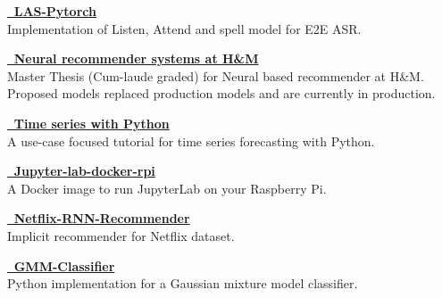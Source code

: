 



\textcolor{SlateGrey}{\textbf{\href{https://github.com/jiwidi/las-pytorch}{\faGithub \, LAS-Pytorch }}} \\ 
Implementation of Listen, Attend and spell model for E2E ASR.
\newline
\vspace{1pt}

\textcolor{SlateGrey}{\textbf{\href{https://github.com/jiwidi/MASTER_THESIS/blob/master/thesis.pdf}{\faGithub \,  Neural recommender systems at H\&M  }}} \\ 
Master Thesis (Cum-laude graded) for Neural based recommender at H\&M. Proposed models replaced production models and are currently in production.
\newline
\vspace{1pt}

\textcolor{SlateGrey}{\textbf{\href{https://github.com/jiwidi/time-series-forecasting-with-python}{\faGithub \,  Time series with Python  }}} \\ 
A use-case focused tutorial for time series forecasting with Python.
\newline
\vspace{1pt}


\textcolor{SlateGrey}{\textbf{\href{https://github.com/jiwidi/jupyter-lab-docker-rpi}{\faGithub \, Jupyter-lab-docker-rpi}}} \\ 
A Docker image to run JupyterLab on your Raspberry Pi. 
\newline
\vspace{1pt}



\textcolor{SlateGrey}{\textbf{\href{https://github.com/jiwidi/Netflix-RNN-Recommender}{\faGithub \, Netflix-RNN-Recommender}}} \\ 
Implicit recommender for Netflix dataset.
\newline
\vspace{1pt}

\textcolor{SlateGrey}{\textbf{\href{https://github.com/jiwidi/gmm-classifier}{\faGithub \, GMM-Classifier}}} \\ 
Python implementation for a Gaussian mixture model classifier.
\newline
\vspace{1pt}

